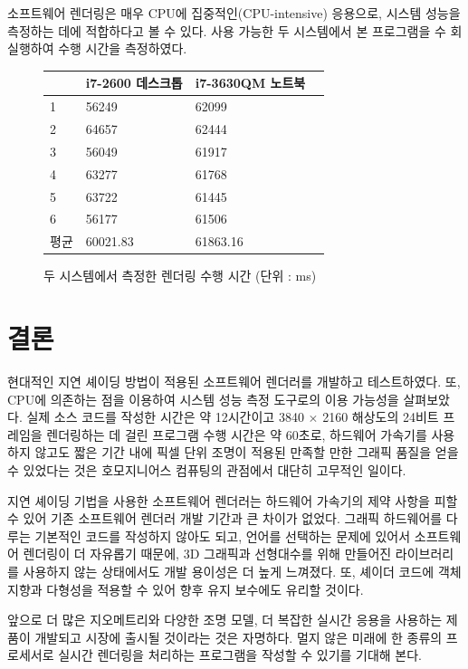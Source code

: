 \documentclass[a4paper,itemph,amsmath,oneside,11pt,openany]{xoblivoir}
\begin{document}
소프트웨어 렌더링은 매우 CPU에 집중적인(CPU-intensive) 응용으로, 시스템 성능을 측정하는 데에 적합하다고 볼 수 있다.
사용 가능한 두 시스템에서 본 프로그램을 수 회 실행하여 수행 시간을 측정하였다.

\begin{figure}
\begin{center}
     \begin{tabular}{| l | l | l | l |}
     \hline
      & i7-2600 데스크톱 & i7-3630QM 노트북 \\ \hline
1&	56249 &	62099 \\ \hline
2&	64657 &	62444 \\ \hline
3&	56049 &	61917 \\ \hline
4&	63277 &	61768 \\ \hline
5&	63722 &	61445 \\ \hline
6&	56177 &	61506 \\ \hline
평균&	60021.83 & 	61863.16 \\ \hline
     \end{tabular}
\caption{두 시스템에서 측정한 렌더링 수행 시간 (단위 : ms)}
\end{center}
\end{figure}


\section{결론}

현대적인 지연 셰이딩 방법이 적용된 소프트웨어 렌더러를 개발하고 테스트하였다. 또, CPU에 의존하는 점을 이용하여
시스템 성능 측정 도구로의 이용 가능성을 살펴보았다. 실제 소스 코드를 작성한 시간은 약 12시간이고
3840 $\times$ 2160 해상도의 24비트 프레임을 렌더링하는 데 걸린 프로그램 수행 시간은 약 60초로,
하드웨어 가속기를 사용하지 않고도 짧은 기간 내에 픽셀 단위 조명이 적용된 만족할 만한 그래픽 품질을 얻을 수 있었다는 것은
호모지니어스 컴퓨팅의 관점에서 대단히 고무적인 일이다.

지연 셰이딩 기법을 사용한 소프트웨어 렌더러는 하드웨어 가속기의 제약 사항을 피할 수 있어
기존 소프트웨어 렌더러 개발 기간과 큰 차이가 없었다. 그래픽 하드웨어를 다루는 기본적인
코드를 작성하지 않아도 되고, 언어를 선택하는 문제에 있어서 소프트웨어 렌더링이 더 자유롭기 때문에,
3D 그래픽과 선형대수를 위해 만들어진 라이브러리를 사용하지 않는 상태에서도 개발 용이성은 더 높게 느껴졌다.
또, 셰이더 코드에 객체 지향과 다형성을 적용할 수 있어 향후 유지 보수에도 유리할 것이다.

앞으로 더 많은 지오메트리와 다양한 조명 모델, 더 복잡한 실시간 응용을 사용하는 제품이 개발되고
시장에 출시될 것이라는 것은 자명하다. 멀지 않은 미래에 한 종류의 프로세서로 실시간 렌더링을 처리하는 프로그램을
작성할 수 있기를 기대해 본다.
\end{document}
